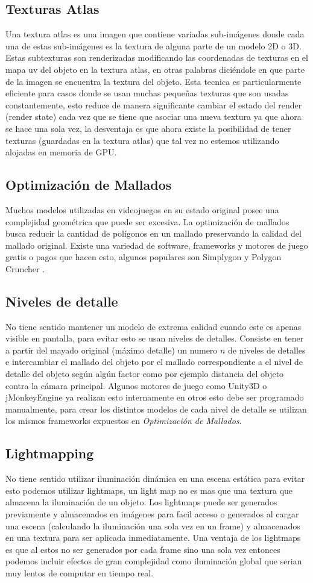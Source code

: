\subsection{Texturas Atlas}
Una textura atlas es una imagen que contiene variadas sub-imágenes donde cada una de estas sub-imágenes es la textura de alguna parte de un modelo 2D o 3D. Estas subtexturas son renderizadas modificando las coordenadas de texturas en el mapa uv del objeto en la textura atlas, en otras palabras diciéndole en que parte de la imagen se encuentra la textura del objeto. Esta tecnica es particularmente eficiente para casos donde se usan muchas pequeñas texturas que son usadas constantemente, esto reduce de manera significante cambiar el estado del render (render state) cada vez que se tiene que asociar una nueva textura ya que ahora se hace una sola vez, la desventaja es que ahora existe la posibilidad de tener texturas (guardadas en la textura atlas) que tal vez no estemos utilizando alojadas en memoria de GPU.
\subsection{Optimización de Mallados}
Muchos modelos utilizadas en videojuegos en su estado original posee una complejidad geométrica que puede ser excesiva.  La optimización de mallados busca reducir la cantidad de polígonos en un mallado preservando la calidad del mallado original. Existe una variedad de software, frameworks y motores de juego gratis o pagos que hacen esto, algunos populares son Simplygon \cite{simplygon} y Polygon Cruncher \cite{polygon_sdk}.
\subsection{Niveles de detalle}
No tiene sentido mantener un modelo de extrema calidad cuando este es apenas visible en pantalla, para evitar esto se usan niveles de detalles. Consiste en tener a partir del mayado original (máximo detalle) un numero $n$ de niveles de detalles e intercambiar el mallado del objeto por el mallado correspondiente a el nivel de detalle del objeto según algún factor como por ejemplo distancia del objeto contra la cámara principal. Algunos motores de juego como Unity3D \cite{unity_lod} o jMonkeyEngine \cite{jmonkey} ya realizan esto internamente en otros esto debe ser programado manualmente, para crear los distintos modelos de cada nivel de detalle se utilizan los mismos frameworks expuestos en \emph{Optimización de Mallados}.
\subsection{Lightmapping}
No tiene sentido utilizar iluminación dinámica en una escena estática para evitar esto podemos utilizar lightmaps, un light map no es mas que una textura que almacena la iluminación de un objeto. Los lightmaps puede ser generados previamente y almacenados en imágenes para facil acceso o generados al cargar una escena (calculando la iluminación una sola vez en un frame) y almacenados en una textura para ser aplicada inmediatamente. Una ventaja de los lightmaps es que al estos no ser generados por cada frame sino una sola vez entonces podemos incluir efectos de gran complejidad como iluminación global que serian muy lentos de computar en tiempo real.
